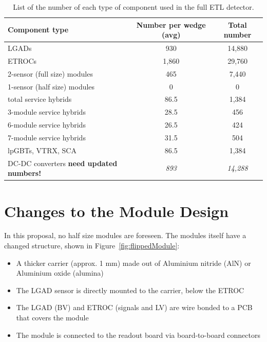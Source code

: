 \documentclass[11pt]{article}
\begin{document}
\begin{table}
  \caption{List of the number of each type of component used in the full ETL detector.}
  \centering
  \begin{tabular}{ l c c }
    Component type               & Number per wedge (avg) & Total number \\
    \midrule
    LGADs                        & 930             & 14,880      \\
    ETROCs                       & 1,860           & 29,760      \\
    2-sensor (full size) modules & 465             & 7,440       \\
    1-sensor (half size) modules & 0               & 0       \\
    total service hybrids     & 86.5               & 1,384       \\
    3-module service hybrids  & 28.5               & 456         \\
    6-module service hybrids  & 26.5               & 424         \\
    7-module service hybrids  & 31.5               & 504         \\
    lpGBTs, VTRX, SCA         & 86.5               & 1,384       \\
    DC-DC converters \textbf{need updated numbers!}          & \textit{893}    & \textit{14,288}        \\ %
  \end{tabular}
  \label{tab:ETLNumberOfComponents}
\end{table}

\section{Changes to the Module Design}

In this proposal, no half size modules are foreseen.
The modules itself have a changed structure, shown in Figure~\ref{fig:flippedModule}:
\begin{itemize}
  \item A thicker carrier (approx. 1 mm) made out of Aluminium nitride (AlN) or Aluminium oxide (alumina)
  \item The LGAD sensor is directly mounted to the carrier, below the ETROC
  \item The LGAD (BV) and ETROC (signals and LV) are wire bonded to a PCB that covers the module
  \item The module is connected to the readout board via board-to-board connectors
\end{itemize}
\end{document}
